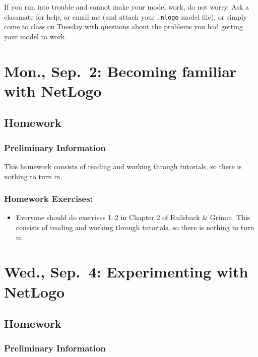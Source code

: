 \documentclass[
]{article}
\providecommand{\tightlist}{%
  \setlength{\itemsep}{0pt}\setlength{\parskip}{0pt}}
\begin{document}
If you run into trouble and cannot make your model work, do not worry.
Ask a classmate for help, or email me (and attach your \texttt{.nlogo}
model file), or simply come to class on Tuesday with questions about the
problems you had getting your model to work.

\section{Mon., Sep.~2: Becoming familiar with
NetLogo}\label{mon.-sep.-2-becoming-familiar-with-netlogo}

\subsection{Homework}\label{homework-2}

\subsubsection{Preliminary Information}\label{preliminary-information-1}

This homework consists of reading and working through tutorials, so
there is nothing to turn in.

\subsubsection{Homework Exercises:}\label{homework-exercises-2}

\begin{itemize}
\tightlist
\item
  Everyone should do exercises 1--2 in Chapter 2 of Railsback \& Grimm.
  This consists of reading and working through tutorials, so there is
  nothing to turn in.
\end{itemize}

\section{Wed., Sep.~4: Experimenting with
NetLogo}\label{wed.-sep.-4-experimenting-with-netlogo}

\subsection{Homework}\label{homework-3}

\subsubsection{Preliminary Information}\label{preliminary-information-2}
\end{document}
